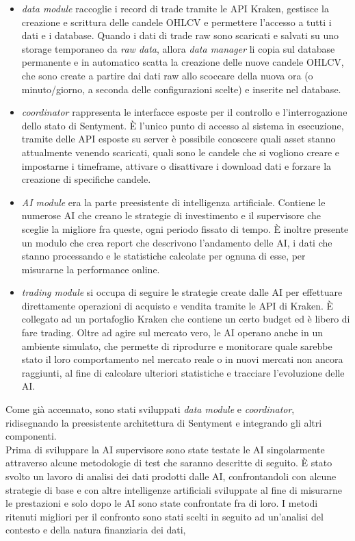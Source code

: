 \documentclass[a4paper,12pt]{report}
\begin{document}
\begin{itemize}
	\item \textit{data module} raccoglie i record di trade tramite le API Kraken, gestisce la creazione e scrittura delle candele OHLCV e permettere l'accesso a tutti i dati e i database. Quando i dati di trade raw sono scaricati e salvati su uno storage temporaneo da \textit{raw data}, allora \textit{data manager} li copia sul database permanente e in automatico scatta la creazione delle nuove candele OHLCV, che sono create a partire dai dati raw allo scoccare della nuova ora (o minuto/giorno, a seconda delle configurazioni scelte) e inserite nel database.
	\item \textit{coordinator} rappresenta le interfacce esposte per il controllo e l'interrogazione dello stato di Sentyment. È l'unico punto di accesso al sistema in esecuzione, tramite delle API esposte su server è possibile conoscere quali asset stanno attualmente venendo scaricati, quali sono le candele che si vogliono creare e impostarne i timeframe, attivare o disattivare i download dati e forzare la creazione di specifiche candele.
	\item \textit{AI module} era la parte preesistente di intelligenza artificiale. Contiene le numerose AI che creano le strategie di investimento e il supervisore che sceglie la migliore fra queste, ogni periodo fissato di tempo. È inoltre presente un modulo che crea report che descrivono l'andamento delle AI, i dati che stanno processando e le statistiche calcolate per ognuna di esse, per misurarne la performance online.
	\item \textit{trading module} si occupa di seguire le strategie create dalle AI per effettuare direttamente operazioni di acquisto e vendita tramite le API di Kraken. È collegato ad un portafoglio Kraken che contiene un certo budget ed è libero di fare trading. Oltre ad agire sul mercato vero, le AI operano anche in un ambiente simulato, che permette di riprodurre e monitorare quale sarebbe stato il loro comportamento nel mercato reale o in nuovi mercati non ancora raggiunti, al fine di calcolare ulteriori statistiche e tracciare l'evoluzione delle AI.
\end{itemize}

Come già accennato, sono stati sviluppati \textit{data module} e \textit{coordinator}, ridisegnando la preesistente architettura di Sentyment e integrando gli altri componenti.\\
Prima di sviluppare la AI supervisore sono state testate le AI singolarmente attraverso alcune metodologie di test che saranno descritte di seguito. È stato svolto un lavoro di analisi dei dati prodotti dalle AI, confrontandoli con alcune strategie di base e con altre intelligenze artificiali sviluppate al fine di misurarne le prestazioni e solo dopo le AI sono state confrontate fra di loro. I metodi ritenuti migliori per il confronto sono stati scelti in seguito ad un'analisi del contesto e della natura finanziaria dei dati, 
\end{document}
